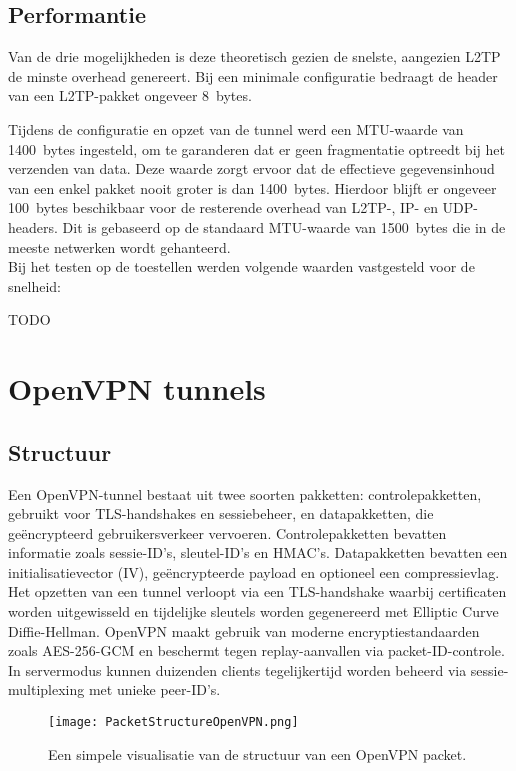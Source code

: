 \subsection{Performantie}

Van de drie mogelijkheden is deze theoretisch gezien de snelste, aangezien L2TP de minste overhead genereert.
Bij een minimale configuratie bedraagt de header van een L2TP-pakket ongeveer 8~bytes.

Tijdens de configuratie en opzet van de tunnel werd een MTU-waarde van 1400~bytes ingesteld, om te garanderen dat er geen fragmentatie optreedt bij het verzenden van data.
Deze waarde zorgt ervoor dat de effectieve gegevensinhoud van een enkel pakket nooit groter is dan 1400~bytes. Hierdoor blijft er ongeveer 100~bytes beschikbaar voor de resterende overhead van L2TP-, IP- en UDP-headers.
Dit is gebaseerd op de standaard MTU-waarde van 1500~bytes die in de meeste netwerken wordt gehanteerd.
\\

Bij het testen op de toestellen werden volgende waarden vastgesteld voor de snelheid:

TODO

\section{OpenVPN tunnels}
\label{sec:openvpn}

\subsection{Structuur}

Een OpenVPN-tunnel bestaat uit twee soorten pakketten: controlepakketten, gebruikt voor TLS-handshakes en sessiebeheer, en datapakketten, die geëncrypteerd gebruikersverkeer vervoeren. Controlepakketten bevatten informatie zoals sessie-ID’s, sleutel-ID’s en HMAC’s. Datapakketten bevatten een initialisatievector (IV), geëncrypteerde payload en optioneel een compressievlag.
Het opzetten van een tunnel verloopt via een TLS-handshake waarbij certificaten worden uitgewisseld en tijdelijke sleutels worden gegenereerd met Elliptic Curve Diffie-Hellman.
OpenVPN maakt gebruik van moderne encryptiestandaarden zoals AES-256-GCM en beschermt tegen replay-aanvallen via packet-ID-controle. In servermodus kunnen duizenden clients tegelijkertijd worden beheerd via sessie-multiplexing met unieke peer-ID’s.

\begin{figure}[H]
    \centering
    \texttt{[image: PacketStructureOpenVPN.png]}
    \caption[Structuur van OpenVPN]{\label{fig:OpenVPNStructure}Een simpele visualisatie van de structuur van een OpenVPN packet.}
\end{figure}

